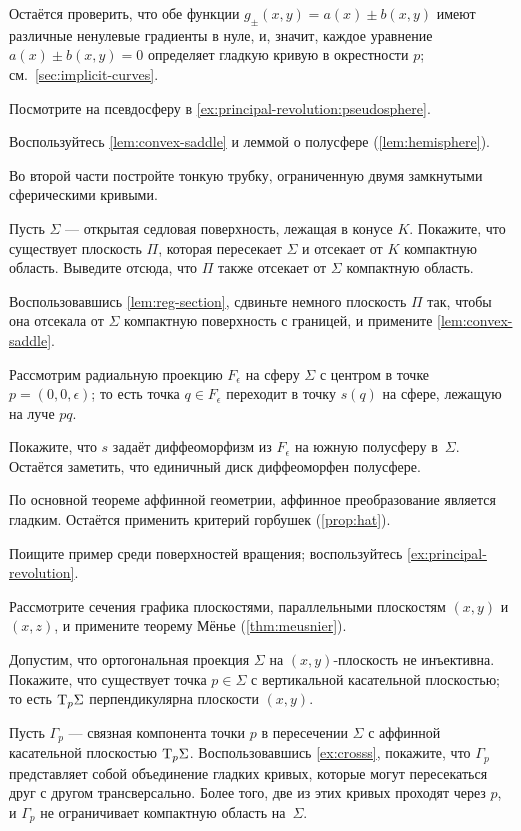 \begin{multicols}{2}
Остаётся проверить, что обе функции $g_\pm(x,y)=a(x)\pm b(x,y)$ имеют различные ненулевые градиенты в нуле, и, значит, каждое уравнение $a(x)\pm b(x,y) =0$ определяет гладкую кривую в окрестности $p$;
см.~\ref{sec:implicit-curves}.

Посмотрите на псевдосферу в \ref{ex:principal-revolution:pseudosphere}.

Воспользуйтесь \ref{lem:convex-saddle} и леммой о полусфере (\ref{lem:hemisphere}).

Во второй части постройте тонкую трубку, ограниченную двумя замкнутыми сферическими кривыми.

Пусть $\Sigma$ --- открытая седловая поверхность, лежащая в конусе $K$.
Покажите, что существует плоскость $\Pi$, которая пересекает $\Sigma$ и отсекает от $K$ компактную область.
Выведите отсюда, что $\Pi$ также отсекает от $\Sigma$ компактную область.

Воспользовавшись \ref{lem:reg-section}, сдвиньте немного плоскость $\Pi$ так, чтобы она отсекала от $\Sigma$ компактную поверхность с границей, и примените \ref{lem:convex-saddle}.

Рассмотрим радиальную проекцию $F_\epsilon$ на сферу $\Sigma$ с центром в точке $p=(0,0,\epsilon)$;
то есть точка $q\in F_\epsilon$ переходит в точку $s(q)$ на сфере, лежащую на луче $pq$.

Покажите, что $s$ задаёт диффеоморфизм из $F_\epsilon$ на южную полусферу в~$\Sigma$.
Остаётся заметить, что единичный диск диффеоморфен полусфере.

По основной теореме аффинной геометрии, аффинное преобразование является гладким.
Остаётся применить критерий горбушек (\ref{prop:hat}).

Поищите пример среди поверхностей вращения;
воспользуйтесь \ref{ex:principal-revolution}.

Рассмотрите сечения графика плоскостями, параллельными плоскостям $(x,y)$ и $(x,z)$, и примените теорему Мёнье (\ref{thm:meusnier}).

Допустим, что ортогональная проекция $\Sigma$ на $(x,y)$-плоскость не инъективна.
Покажите, что существует точка $p\in\Sigma$ с вертикальной касательной плоскостью;
то есть $\mathrm{T}_p\Sigma$ перпендикулярна плоскости $(x,y)$.

Пусть $\Gamma_p$ --- связная компонента точки $p$ в пересечении $\Sigma$ с аффинной касательной плоскостью $\mathrm{T}_p\Sigma$.
Воспользовавшись \ref{ex:crosss}, покажите, что $\Gamma_p$ представляет собой объединение гладких кривых, которые могут пересекаться друг с другом трансверсально.
Более того, две из этих кривых проходят через $p$, и $\Gamma_p$ не ограничивает компактную область на~$\Sigma$.


\end{multicols}
